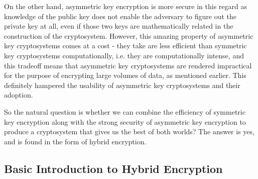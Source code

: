 On the other hand, asymmetric key encryption is more secure in this regard as knowledge of the public key does not enable the adversary to figure out the private key at all, even if those two keys are mathematically related in the construction of the cryptosystem. However, this amazing property of asymmetric key cryptosystems comes at a cost - they take are less efficient than symmetric key cryptosystems computationally, i.e. they are computationally intense, and this tradeoff means that asymmetric key cryptosystems are rendered impractical for the purpose of encrypting large volumes of data, as mentioned earlier. This definitely hampered the usability of asymmetric key cryptosystems and their adoption.

So the natural question is whether we can combine the efficiency of symmetric key encryption along with the strong security of asymmetric key encryption to produce a cryptosystem that gives us the best of both worlds? The answer is yes, and is found in the form of hybrid encryption.

\subsection{Basic Introduction to Hybrid Encryption}

\label{sec:intro}
